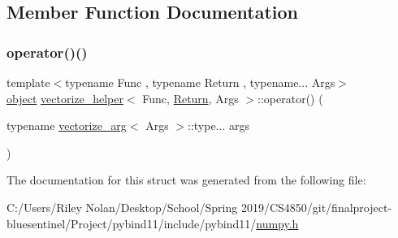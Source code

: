 \subsection{Member Function Documentation}
\mbox{\label{structvectorize__helper_a02c424f9db2ec2f63c23741d908acd3f}} 
\subsubsection{\texorpdfstring{operator()()}{operator()()}}
{\footnotesize\ttfamily template$<$typename Func , typename Return , typename... Args$>$ \\
\mbox{\hyperlink{classobject}{object}} \mbox{\hyperlink{structvectorize__helper}{vectorize\+\_\+helper}}$<$ Func, \mbox{\hyperlink{_python-ast_8h_abdae7f49d66ce8e500825bb53aa14901}{Return}}, Args $>$\+::operator() (\begin{DoxyParamCaption}\item[{typename \mbox{\hyperlink{structvectorize__arg}{vectorize\+\_\+arg}}$<$ Args $>$\+::type...}]{args }\end{DoxyParamCaption})\hspace{0.3cm}{\ttfamily [inline]}}



The documentation for this struct was generated from the following file\+:\begin{DoxyCompactItemize}
\item 
C\+:/\+Users/\+Riley Nolan/\+Desktop/\+School/\+Spring 2019/\+C\+S4850/git/finalproject-\/bluesentinel/\+Project/pybind11/include/pybind11/\mbox{\hyperlink{numpy_8h}{numpy.\+h}}\end{DoxyCompactItemize}
